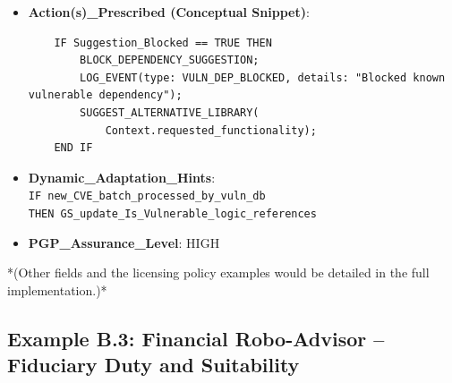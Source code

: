 \documentclass[sigconf,review,anonymous=false]{acmart} %
\begin{document}
\begin{itemize}
{    }
    \item \textbf{Action(s)\_Prescribed (Conceptual Snippet)}:
    {\scriptsize
    \begin{verbatim}
    IF Suggestion_Blocked == TRUE THEN
        BLOCK_DEPENDENCY_SUGGESTION;
        LOG_EVENT(type: VULN_DEP_BLOCKED, details: "Blocked known vulnerable dependency");
        SUGGEST_ALTERNATIVE_LIBRARY(
            Context.requested_functionality);
    END IF
    \end{verbatim}
    }
    \item \textbf{Dynamic\_Adaptation\_Hints}: \\
    \texttt{IF new\_CVE\_batch\_processed\_by\_vuln\_db} \\
    \texttt{THEN GS\_update\_Is\_Vulnerable\_logic\_references}
    \item \textbf{PGP\_Assurance\_Level}: HIGH
\end{itemize}
*(Other fields and the licensing policy examples would be detailed in the full implementation.)*

\subsection{Example B.3: Financial Robo-Advisor – Fiduciary Duty and Suitability}
\label{app:policy_example_finance}
\end{document}
